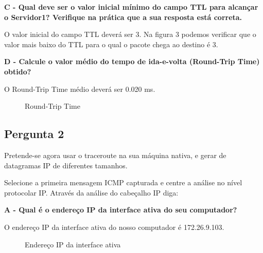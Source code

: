 \documentclass[11pt]{article}
\begin{document}
\vspace{0.5cm}

\textbf{C - Qual deve ser o valor inicial mínimo do campo TTL para alcançar o Servidor1? Verifique na prática que a sua resposta está correta.}

O valor inicial do campo TTL deverá ser 3. Na figura 3 podemos verificar que o valor mais baixo do TTL para o qual o pacote chega ao destino é 3.

\vspace{1cm}

\textbf{D - Calcule o valor médio do tempo de ida-e-volta (Round-Trip Time) obtido?}

O Round-Trip Time médio deverá ser 0.020 ms.

\begin{figure}[hbt!]
    \centering
    \caption{Round-Trip Time}
\end{figure}

\subsection{Pergunta 2}

Pretende-se agora usar o traceroute na sua máquina nativa, e gerar de datagramas IP de diferentes tamanhos.

Selecione a primeira mensagem ICMP capturada e centre a análise no nível protocolar IP. Através da análise do cabeçalho IP diga: 

\vspace{0.5cm}

\textbf{A - Qual é o endereço IP da interface ativa do seu computador?}

O endereço IP da interface ativa do nosso computador é 172.26.9.103.

\begin{figure}[hbt!]
    \centering
    \caption{Endereço IP da interface ativa}
\end{figure}
\end{document}
